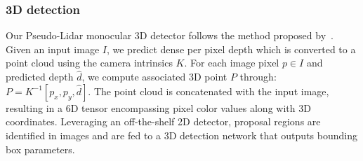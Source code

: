 






\subsubsection{3D detection}
\label{subsubsec:pl_3d_det}

Our Pseudo-Lidar monocular 3D detector follows the method proposed by~\cite{qi2018frustum,ma2020rethinking}. Given an input image $I$, we predict dense per pixel depth which is converted to a point cloud using the camera intrinsics $K$. For each image pixel $p \in I$ and predicted depth $\hat{d}$, we compute associated 3D point $P$ through: $P=K^{-1}\left[p_x, p_y, \hat{d}\right]$. The point cloud is concatenated with the input image, resulting in a 6D tensor encompassing pixel color values along with 3D coordinates. Leveraging an off-the-shelf 2D detector, proposal regions are identified in images and are fed to a 3D detection network that outputs bounding box parameters. 

